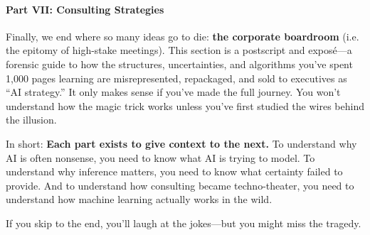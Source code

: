 \paragraph{Part VII: Consulting Strategies}
Finally, we end where so many ideas go to die: \textbf{the corporate boardroom} (i.e. the epitomy of high-stake meetings). This section is a postscript and exposé—a forensic guide to how the structures, uncertainties, and algorithms you've spent 1,000 pages learning are misrepresented, repackaged, and sold to executives as “AI strategy.” It only makes sense if you've made the full journey. You won’t understand how the magic trick works unless you’ve first studied the wires behind the illusion.

\bigskip

In short: \textbf{Each part exists to give context to the next.} To understand why AI is often nonsense, you need to know what AI is trying to model. To understand why inference matters, you need to know what certainty failed to provide. And to understand how consulting became techno-theater, you need to understand how machine learning actually works in the wild.

If you skip to the end, you’ll laugh at the jokes—but you might miss the tragedy.


